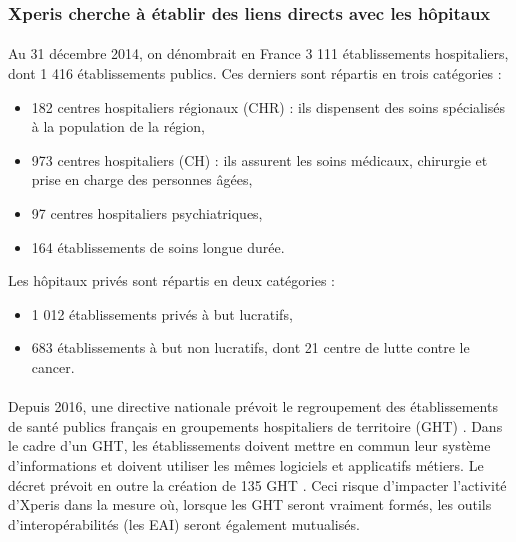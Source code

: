 		\subsubsection{Xperis cherche à établir des liens directs avec les hôpitaux}
			\paragraph{}%
			Au 31 décembre 2014, on dénombrait en France 3 111 établissements hospitaliers, 
			dont 1 416 établissements publics. Ces derniers sont répartis en trois catégories 
			\citep{drees_panoramas_2016} :
			\begin{itemize}
				\item 182 centres hospitaliers régionaux (CHR) : ils dispensent des soins 
				spécialisés à la population de la région,
				\item 973 centres hospitaliers (CH) : ils assurent les soins médicaux, 
				chirurgie et prise en charge des personnes âgées,
				\item 97 centres hospitaliers psychiatriques,
				\item 164 établissements de soins longue durée.
			\end{itemize}
			Les hôpitaux privés sont répartis en deux catégories :
			\begin{itemize}
				\item 1 012 établissements privés à but lucratifs,
				\item 683 établissements à but non lucratifs, dont 21 centre de lutte contre 
				le cancer.
			\end{itemize}
			
			\paragraph{}%
			Depuis 2016, une directive nationale prévoit le regroupement des établissements de 
			santé publics français en groupements hospitaliers de territoire (GHT) 
			\citep{valls_decret_2016}. Dans le cadre d'un GHT, les établissements doivent mettre 
			en commun leur système d'informations et doivent utiliser les mêmes logiciels et 
			applicatifs métiers. Le décret prévoit en outre la création de 135 GHT  
			\citep{touraine_marisol_2016}. Ceci risque d'impacter l'activité d'Xperis dans la 
			mesure où, lorsque les GHT seront vraiment formés, les outils d'interopérabilités 
			(les EAI) seront également mutualisés.
			
